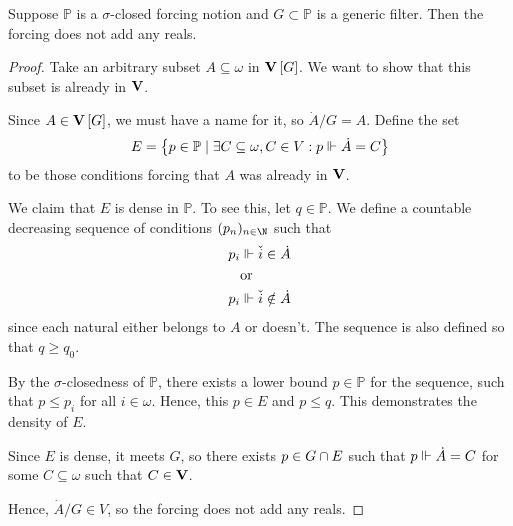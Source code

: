 \documentclass[11pt]{article}
\renewcommand{\P}{\mathbb{P}}
\begin{document}
\begin{prop}
    Suppose $\P$ is a $\sigma$-closed forcing notion and $G \subset \P$ is a
    generic filter. Then the forcing does not add any reals.
\end{prop}

\begin{proof}
    Take an arbitrary subset $A \subseteq \omega$ in $\m$.
    We want to show that this subset is already in $\verum$.

    Since $A \in \m$, we must have a name for it, so $\dot A / G = A$.
    Define the set
    \begin{equation*}
        E = \setof{
            p \in \P
            \sth
            \exists C \subseteq \omega, C \in V: p \forces \dot A = C
        }
    \end{equation*}
    to be those conditions forcing that $A$ was already in $\verum$.

    We claim that $E$ is dense in $\P$. To see this, let $q \in \P$.
    We define a countable decreasing sequence of conditions $(p_n)_{n\in\N}$
    such that
    \begin{align*}
        p_i &\Vdash \check i \in \dot A \\
            &\text{or} \\
        p_i &\Vdash \check i \notin \dot A
    \end{align*}
    since each natural either belongs to $A$ or doesn't. The sequence is also
    defined so that $q \geq q_0$.

    By the $\sigma$-closedness of $\P$, there exists a lower bound $p \in \P$
    for the sequence, such that $p \leq p_i$ for all $i \in \omega$.
    Hence, this $p \in E$ and $p \leq q$. This demonstrates the density of $E$.

    Since $E$ is dense, it meets $G$, so there exists $p \in G \cap E$ such
    that $p \Vdash \dot A = C$ for some $C \subseteq \omega$ such that
    $C \in \verum$.

    Hence, $\dot A / G \in V$, so the forcing does not add any reals.
\end{proof}
\end{document}

